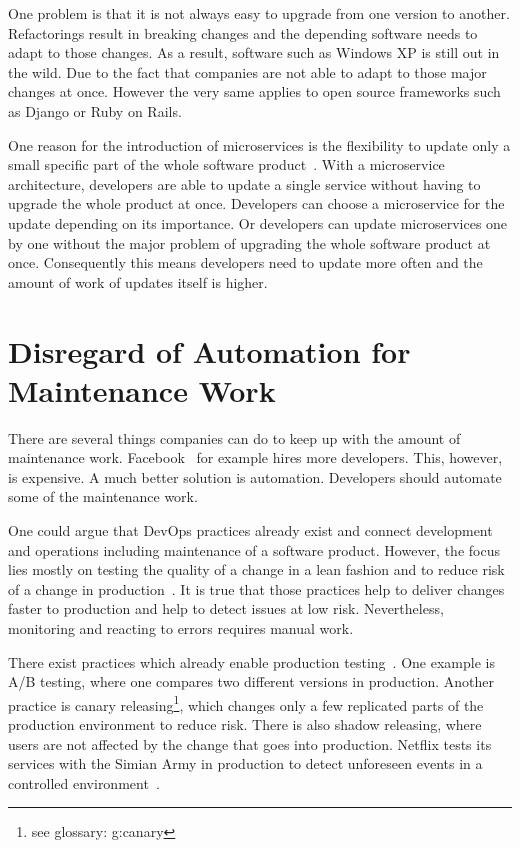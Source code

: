One problem is that it is not always easy to upgrade from one version to
another. Refactorings result in breaking changes and the depending software needs to adapt
to those changes. As a result, software such as Windows XP is still out in the wild. Due to
the fact that companies are not able to adapt to those major changes at once. However the
very same applies to open source frameworks such as Django or Ruby on Rails.

One reason for the introduction of microservices is the flexibility to update only a small
specific part of the whole software product~\cite{microservices_fowler}. With a
microservice architecture, developers are able to update a single service without having
to upgrade the whole product at once. Developers can choose a microservice for the update
depending on its importance. Or developers can update microservices one by one without the
major problem of upgrading the whole software product at once. Consequently this means
developers need to update more often and the amount of work of updates itself is higher.

\section{Disregard of Automation for Maintenance Work}

There are several things companies can do to keep up with the amount of maintenance
work. Facebook~\cite{dev_at_fb} for example hires more developers. This, however, is
expensive. A much better solution is automation. Developers should automate some of the
maintenance work.

One could argue that DevOps practices already exist and connect development and operations
including maintenance of a software product. However, the focus lies mostly on testing the
quality of a change in a lean fashion and to reduce risk of a change in
production~\cite{devops_definition}. It is true that those practices help to deliver
changes faster to production and help to detect issues at low risk. Nevertheless,
monitoring and reacting to errors requires manual work.

There exist practices which already enable production testing~\cite{dev_at_fb}. One
example is A/B testing, where one compares two different versions in production. Another
practice is canary releasing\footnote{see glossary: \gls{g:canary}}, which changes only a few
replicated parts of the production environment to reduce risk. There is also shadow
releasing, where users are not affected by the change that goes into production. Netflix
tests its services with the Simian Army in production to detect unforeseen events in a
controlled environment~\cite{antifragile_org}.

